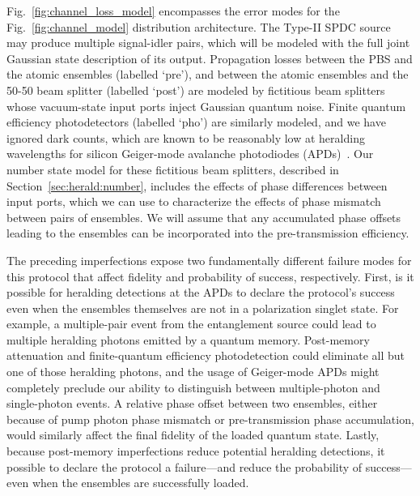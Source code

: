 \documentclass[aps,twocolumn,secnumarabic,amsmath,amssymb,pra,groupedaddress,
showpacs, showkeys]{revtex4-1}
\begin{document}
Fig.~\ref{fig:channel_loss_model} encompasses the error modes for the
Fig.~\ref{fig:channel_model} distribution architecture. The Type-II SPDC source
may produce multiple signal-idler pairs, which will be modeled with the full
joint Gaussian state description of its output. Propagation losses between the
PBS and the atomic ensembles (labelled `pre'), and between the atomic ensembles
and the 50-50 beam splitter (labelled `post') are modeled by fictitious beam
splitters whose vacuum-state input ports inject Gaussian quantum noise. Finite
quantum efficiency photodetectors (labelled `pho') are similarly modeled, and
we have ignored dark counts, which are known to be reasonably low at heralding
wavelengths for silicon Geiger-mode avalanche photodiodes
(APDs)~\cite{Thomas2010}. Our number state model for these fictitious beam
splitters, described in Section~\ref{sec:herald:number}, includes the effects
of phase differences between input ports, which we can use to characterize the
effects of phase mismatch between pairs of ensembles. We will assume that any
accumulated phase offsets leading to the ensembles can be incorporated into the
pre-transmission efficiency.

The preceding imperfections expose two fundamentally different failure modes
for this protocol that affect fidelity and probability of success,
respectively. First, is it possible for heralding detections at the APDs to
declare the protocol's success even when the ensembles themselves are not in a
polarization singlet state. For example, a multiple-pair event from the
entanglement source could lead to multiple heralding photons emitted by a
quantum memory. Post-memory attenuation and finite-quantum efficiency
photodetection could eliminate all but one of those heralding photons, and the
usage of Geiger-mode APDs might completely preclude our ability to distinguish
between multiple-photon and single-photon events. A relative phase offset
between two ensembles, either because of pump photon phase mismatch or
pre-transmission phase accumulation, would similarly affect the final fidelity
of the loaded quantum state. Lastly, because post-memory imperfections reduce
potential heralding detections, it possible to declare the protocol a
failure---and reduce the probability of success---even when the ensembles are
successfully loaded.
\end{document}
